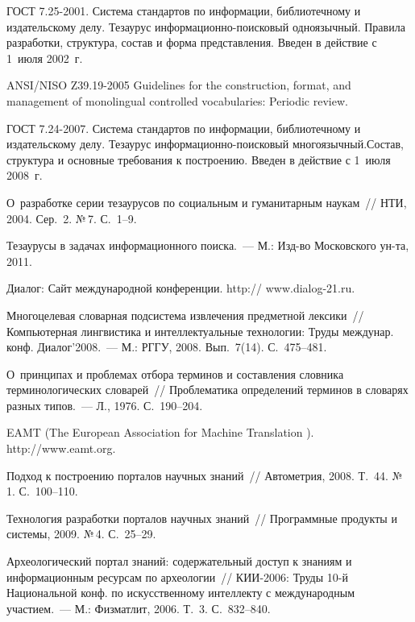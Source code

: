 \begin{multicols}{2}
{{\begin{thebibliography}{99}
  ГОСТ 7.25-2001. Система стандартов по информации, библиотечному и издательскому 
делу. Тезаурус ин\-фор\-мационно-поисковый одноязычный. Правила разработки, структура, 
состав и форма представления. Введен в действие с 1~июля 2002~г.
  
  ANSI/NISO Z39.19-2005 Guidelines for the construction, format, and management of 
monolingual controlled vocabularies: Periodic review.

  ГОСТ 7.24-2007. Система стандартов по информации, библиотечному и издательскому 
делу. Тезаурус информационно-поисковый многоязычный.\linebreak Состав, структура и основные 
требования к по\-стро\-ению. Введен в действие с 1~июля 2008~г.
  
   О~разработке серии тезаурусов по социальным и гуманитарным наукам~// НТИ, 2004. 
Сер.~2. №\,7. С.~1--9.
  
  Тезаурусы в задачах информационного поиска.~--- М.: Изд-во Московского ун-та, 2011.
  
  Диалог: Сайт международной конференции. {\sf http:// www.dialog-21.ru}.
  
  Многоцелевая словарная подсистема извлечения предметной лексики~// Компьютерная 
лингвистика и интеллектуальные технологии: Труды междунар. конф. Диалог'2008.~--- М.: 
РГГУ, 2008. Вып.~7(14). С.~475--481.
  
  О~принципах и проблемах отбора терминов и составления словника терминологических 
словарей~// Проблематика определений терминов в словарях разных типов.~--- Л., 1976. 
С.~190--204.
  
  EAMT (The European Association for Machine Translation ). {\sf http://www.eamt.org}.
  
  Подход к построению порталов научных знаний~// Автометрия, 2008. Т.~44. №\,1. 
  С.~100--110.
  
  Технология разработки порталов научных знаний~// Программные продукты и системы, 
2009. №\,4. С.~25--29.
  
  Археологический портал знаний: содержательный доступ к знаниям и информационным 
ресурсам по археологии~// КИИ-2006: Труды 10-й Национальной конф. по искусственному 
интеллекту с международным участием.~--- М.: Физматлит, 2006. Т.~3. С.~832--840.


\end{thebibliography}}}
\end{multicols}
